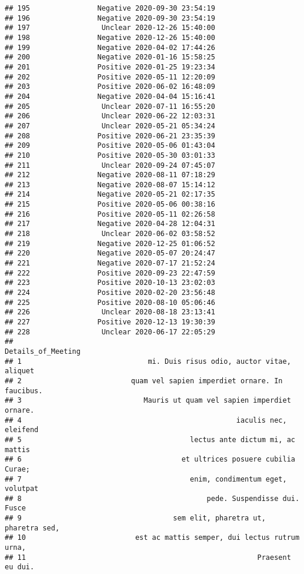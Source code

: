 \documentclass[
]{article}
\begin{document}
\begin{verbatim}
## 195                Negative 2020-09-30 23:54:19
## 196                Negative 2020-09-30 23:54:19
## 197                 Unclear 2020-12-26 15:40:00
## 198                Negative 2020-12-26 15:40:00
## 199                Negative 2020-04-02 17:44:26
## 200                Negative 2020-01-16 15:58:25
## 201                Positive 2020-01-25 19:23:34
## 202                Positive 2020-05-11 12:20:09
## 203                Positive 2020-06-02 16:48:09
## 204                Negative 2020-04-04 15:16:41
## 205                 Unclear 2020-07-11 16:55:20
## 206                 Unclear 2020-06-22 12:03:31
## 207                 Unclear 2020-05-21 05:34:24
## 208                Positive 2020-06-21 23:35:39
## 209                Positive 2020-05-06 01:43:04
## 210                Positive 2020-05-30 03:01:33
## 211                 Unclear 2020-09-24 07:45:07
## 212                Negative 2020-08-11 07:18:29
## 213                Negative 2020-08-07 15:14:12
## 214                Negative 2020-05-21 02:17:35
## 215                Positive 2020-05-06 00:38:16
## 216                Positive 2020-05-11 02:26:58
## 217                Negative 2020-04-28 12:04:31
## 218                 Unclear 2020-06-02 03:58:52
## 219                Negative 2020-12-25 01:06:52
## 220                Negative 2020-05-07 20:24:47
## 221                Negative 2020-07-17 21:52:24
## 222                Positive 2020-09-23 22:47:59
## 223                Positive 2020-10-13 23:02:03
## 224                Positive 2020-02-20 23:56:48
## 225                Positive 2020-08-10 05:06:46
## 226                 Unclear 2020-08-18 23:13:41
## 227                Positive 2020-12-13 19:30:39
## 228                 Unclear 2020-06-17 22:05:29
##                                                        Details_of_Meeting
## 1                              mi. Duis risus odio, auctor vitae, aliquet
## 2                          quam vel sapien imperdiet ornare. In faucibus.
## 3                             Mauris ut quam vel sapien imperdiet ornare.
## 4                                                   iaculis nec, eleifend
## 5                                        lectus ante dictum mi, ac mattis
## 6                                      et ultrices posuere cubilia Curae;
## 7                                        enim, condimentum eget, volutpat
## 8                                            pede. Suspendisse dui. Fusce
## 9                                    sem elit, pharetra ut, pharetra sed,
## 10                          est ac mattis semper, dui lectus rutrum urna,
## 11                                                       Praesent eu dui.

\end{verbatim}
\end{document}
